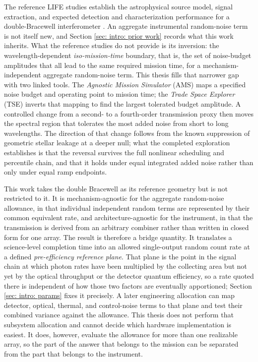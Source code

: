 \documentclass[12pt,a4paper]{article}
\numberwithin{equation}{section}
\numberwithin{figure}{section}
\numberwithin{table}{section}
\begin{document}
The reference LIFE studies establish the astrophysical source model, signal extraction, and expected detection and characterization performance for a double-Bracewell interferometer \cite{quanz2022life1,dannert2022life2,dannert2025thesis}. An aggregate instrumental random-noise term is not itself new, and Section \ref{sec: intro: prior work} records what this work inherits. What the reference studies do not provide is its inversion: the wavelength-dependent \textit{iso-mission-time} boundary, that is, the set of noise-budget amplitudes that all lead to the same required mission time, for a mechanism-independent aggregate random-noise term. This thesis fills that narrower gap with two linked tools. The \textit{Agnostic Mission Simulator} (AMS) maps a specified noise budget and operating point to mission time; the \textit{Trade Space Explorer} (TSE) inverts that mapping to find the largest tolerated budget amplitude. A controlled change from a second- to a fourth-order transmission proxy then moves the spectral region that tolerates the most added noise from short to long wavelengths. The direction of that change follows from the known suppression of geometric stellar leakage at a deeper null; what the completed exploration establishes is that the reversal survives the full nonlinear scheduling and percentile chain, and that it holds under equal integrated added noise rather than only under equal ramp endpoints.

This work takes the double Bracewell as its reference geometry but is not restricted to it. It is mechanism-agnostic for the aggregate random-noise allowance, in that individual independent random terms are represented by their common equivalent rate, and architecture-agnostic for the instrument, in that the transmission is derived from an arbitrary combiner rather than written in closed form for one array. The result is therefore a bridge quantity. It translates a science-level completion time into an allowed single-output random count rate at a defined \textit{pre-efficiency reference plane}. That plane is the point in the signal chain at which photon rates have been multiplied by the collecting area but not yet by the optical throughput or the detector quantum efficiency, so a rate quoted there is independent of how those two factors are eventually apportioned; Section \ref{sec: intro: params} fixes it precisely. A later engineering allocation can map detector, optical, thermal, and control-noise terms to that plane and test their combined variance against the allowance. This thesis does not perform that subsystem allocation and cannot decide which hardware implementation is easiest. It does, however, evaluate the allowance for more than one realizable array, so the part of the answer that belongs to the mission can be separated from the part that belongs to the instrument.
\end{document}
